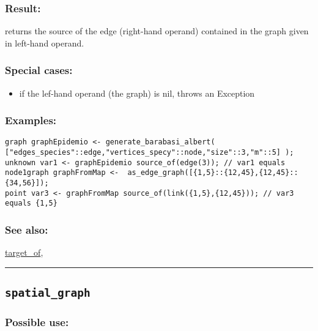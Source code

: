 \documentclass[]{book}
\providecommand{\tightlist}{%
  \setlength{\itemsep}{0pt}\setlength{\parskip}{0pt}}
\theoremstyle{definition}
\theoremstyle{definition}
\theoremstyle{definition}
\theoremstyle{remark}
\begin{document}
\subsubsection{Result:}\label{result-471}

returns the source of the edge (right-hand operand) contained in the
graph given in left-hand operand.

\subsubsection{Special cases:}\label{special-cases-125}

\begin{itemize}
\tightlist
\item
  if the lef-hand operand (the graph) is nil, throws an Exception
\end{itemize}

\subsubsection{Examples:}\label{examples-340}

\begin{verbatim}
graph graphEpidemio <- generate_barabasi_albert( ["edges_species"::edge,"vertices_specy"::node,"size"::3,"m"::5] );  
unknown var1 <- graphEpidemio source_of(edge(3)); // var1 equals node1graph graphFromMap <-  as_edge_graph([{1,5}::{12,45},{12,45}::{34,56}]);  
point var3 <- graphFromMap source_of(link({1,5},{12,45})); // var3 equals {1,5}
\end{verbatim}

\subsubsection{See also:}\label{see-also-189}

\href{operators-s-to-z.html\#target_of}{target\_of},

\begin{center}\rule{0.5\linewidth}{\linethickness}\end{center}

\subsection{\texorpdfstring{\texttt{spatial\_graph}}{spatial\_graph}}\label{spatial_graph}

\subsubsection{Possible use:}\label{possible-use-488}
\end{document}
